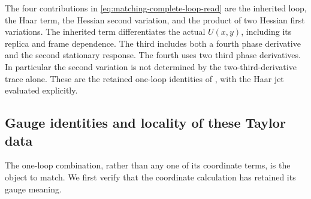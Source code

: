 \documentclass[11pt,reqno]{amsart}
\numberwithin{equation}{section}
\theoremstyle{definition}
\theoremstyle{remark}
\begin{document}
The four contributions in
\eqref{eq:matching-complete-loop-read} are the inherited
loop, the Haar term, the Hessian second variation, and
the product of two Hessian first variations.
The inherited term differentiates the actual \(U(x,y)\),
including its replica and frame dependence.
The third includes both a fourth phase derivative and
the second stationary response. The fourth uses two
third phase derivatives. In particular the second
variation is not determined by the two-third-derivative
trace alone. These are the retained one-loop identities
of \cite[Lemma~36.7 and (36.20), pp.~244--246]{Main},
with the Haar jet evaluated explicitly.

\subsection{Gauge identities and locality of these Taylor data}

The one-loop combination, rather than any one of its
coordinate terms, is the object to match.
We first verify that the coordinate calculation has
retained its gauge meaning.
\end{document}
